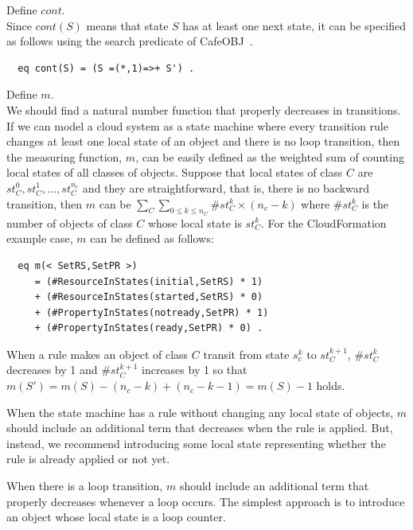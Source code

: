 \documentclass[12pt]{report}
\newcommand{\cafeobj}{{\sf CafeOBJ}~}
\begin{document}
 Define $cont$. \\ Since $cont(S)$ means that
state $S$ has at least one next state, it can be specified as follows
using the search predicate of \cafeobj.
\begin{verbatim}
  eq cont(S) = (S =(*,1)=>+ S') .
\end{verbatim}
 Define $m$. \\ We should find a natural
number function that properly decreases in transitions. If we can
model a cloud system as a state machine where every transition rule
changes at least one local state of an object and there is no loop
transition, then the measuring function, $m$, can be easily defined as
the weighted sum of counting local states of all classes of objects.
Suppose that local states of class $C$ are $st_C^0, st_C^1, \dots ,
st_C^{n_c}$ and they are straightforward, that is, there is no
backward transition, then $m$ can be $\sum_{C} \sum_{0 \le k \le n_C}
\#st_C^k \times (n_c - k)$ where $\#st_C^k$ is the number of objects
of class $C$ whose local state is $st_C^k$. For the CloudFormation
example case, $m$ can be defined as follows:
\begin{verbatim}
  eq m(< SetRS,SetPR >)
     = (#ResourceInStates(initial,SetRS) * 1) 
     + (#ResourceInStates(started,SetRS) * 0)
     + (#PropertyInStates(notready,SetPR) * 1) 
     + (#PropertyInStates(ready,SetPR) * 0) .
\end{verbatim}
When a rule makes an object of class $C$ transit from state $s_c^k$ to
$st_C^{k+1}$, $\#st_C^k$ decreases by 1 and $\#st_C^{k+1}$ increases by 1 so that
$m(S')=m(S)-(n_c-k)+(n_c-k-1)=m(S)-1$ holds.

When the state machine has a rule without changing any local state
of objects, $m$ should include an additional term that decreases when
the rule is applied. But, instead, we recommend introducing some local
state representing whether the rule is already applied or not yet.

When there is a loop transition, $m$ should include an additional term
that properly decreases whenever a loop occurs. The simplest approach
is to introduce an object whose local state is a loop counter.\\
\end{document}
